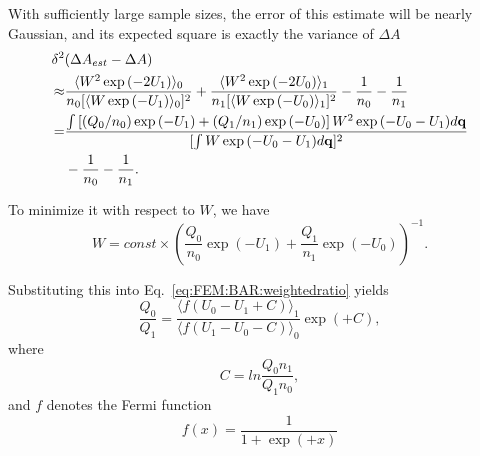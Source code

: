 With sufficiently large sample sizes, the error of this estimate will
be nearly Gaussian, and its expected square is exactly the variance
of $\Delta A$ 
\begin{align}
	\delta^2 & (\Delta A_{est}-\Delta A)\nonumber \\
	\approx & \frac{\langle W^{2}\exp{(-2U_{1})}\rangle_{0}}{n_{0}[\langle W\exp{(-U_{1})}\rangle_{0}]^{2}}+\frac{\langle W^{2}\exp{(-2U_{0})}\rangle_{1}}{n_{1}[\langle W\exp{(-U_{0})}\rangle_{1}]^{2}}-\frac{1}{n_{0}}-\frac{1}{n_{1}}\nonumber \\
	= & \frac{\int\left[(Q_{0}/n_{0})\exp{(-U_{1})}+(Q_{1}/n_{1})\exp{(-U_{0})}\right]W^{2}\exp{(-U_{0}-U_{1})}d\mathbf{{q}}}{[\int W\exp{(-U_{0}-U_{1})}d\mathbf{{q}}]^{2}}\notag\\
	  &-\frac{1}{n_{0}}-\frac{1}{n_{1}}.\label{eq:FEM:BAR:expectation}
\end{align}

To minimize it with respect to $W$, we have
\begin{equation}
	W=const\times\left(\frac{Q_{0}}{n_{0}}\exp{(-U_{1})}+\frac{Q_{1}}{n_{1}}\exp{(-U_{0})}\right)^{-1}.
\end{equation}

Substituting this into Eq.~\ref{eq:FEM:BAR:weightedratio} yields
\begin{equation}
	\frac{Q_{0}}{Q_{1}}=\frac{\langle f(U_{0}-U_{1}+C)\rangle_{1}}{\langle f(U_{1}-U_{0}-C)\rangle_{0}}\exp{(+C)},
	\label{Eq:FEM:BAR:BAR}
\end{equation}
where
\begin{equation}
	C=ln\frac{Q_{0}n_{1}}{Q_{1}n_{0}},
\end{equation}
and $f$ denotes the Fermi function
\begin{equation}
	f(x)=\frac{1}{1+\exp{(+x)}}
\end{equation}